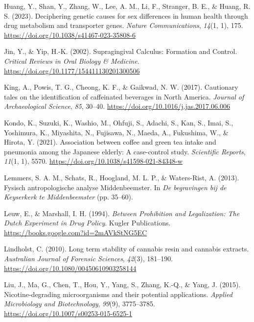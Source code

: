 \documentclass[
]{article}
\newlength{\cslhangindent}
\newenvironment{CSLReferences}[2] %
 {\begin{list}{}{%
  \setlength{\itemindent}{0pt}
  \setlength{\leftmargin}{0pt}
  \setlength{\parsep}{0pt}
  \ifodd #1
   \setlength{\leftmargin}{\cslhangindent}
   \setlength{\itemindent}{-1\cslhangindent}
  \fi
  \setlength{\itemsep}{#2\baselineskip}}}
 {\end{list}}
\begin{document}
\begin{CSLReferences}{1}{0}
Huang, Y., Shan, Y., Zhang, W., Lee, A. M., Li, F., Stranger, B. E., \&
Huang, R. S. (2023). Deciphering genetic causes for sex differences in
human health through drug metabolism and transporter genes. \emph{Nature
Communications}, \emph{14}(1, 1), 175.
\url{https://doi.org/10.1038/s41467-023-35808-6}

Jin, Y., \& Yip, H.-K. (2002). Supragingival {Calculus}: {Formation} and
{Control}. \emph{Critical Reviews in Oral Biology \& Medicine}.
\url{https://doi.org/10.1177/154411130201300506}

King, A., Powis, T. G., Cheong, K. F., \& Gaikwad, N. W. (2017).
Cautionary tales on the identification of caffeinated beverages in
{North America}. \emph{Journal of Archaeological Science}, \emph{85},
30--40. \url{https://doi.org/10.1016/j.jas.2017.06.006}

Kondo, K., Suzuki, K., Washio, M., Ohfuji, S., Adachi, S., Kan, S.,
Imai, S., Yoshimura, K., Miyashita, N., Fujisawa, N., Maeda, A.,
Fukushima, W., \& Hirota, Y. (2021). Association between coffee and
green tea intake and pneumonia among the {Japanese} elderly: A
case-control study. \emph{Scientific Reports}, \emph{11}(1, 1), 5570.
\url{https://doi.org/10.1038/s41598-021-84348-w}

Lemmers, S. A. M., Schats, R., Hoogland, M. L. P., \& Waters-Rist, A.
(2013). Fysisch antropologische analyse Middenbeemster. In \emph{De
begravingen bij de Keyserkerk te Middenbeemster} (pp. 35--60).

Leuw, E., \& Marshall, I. H. (1994). \emph{Between {Prohibition} and
{Legalization}: {The Dutch Experiment} in {Drug Policy}}. {Kugler
Publications}. \url{https://books.google.com?id=2mAVkStNG5EC}

Lindholst, C. (2010). Long term stability of cannabis resin and cannabis
extracts. \emph{Australian Journal of Forensic Sciences}, \emph{42}(3),
181--190. \url{https://doi.org/10.1080/00450610903258144}

Liu, J., Ma, G., Chen, T., Hou, Y., Yang, S., Zhang, K.-Q., \& Yang, J.
(2015). Nicotine-degrading microorganisms and their potential
applications. \emph{Applied Microbiology and Biotechnology},
\emph{99}(9), 3775--3785.
\url{https://doi.org/10.1007/s00253-015-6525-1}


\end{CSLReferences}
\end{document}
